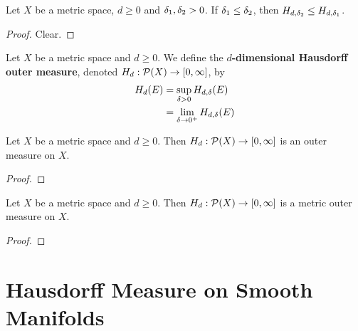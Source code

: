 \documentclass{book}
\begin{document}
	\begin{ex}
	Let $X$ be a metric space, $d \geq 0$ and $\delta_1, \delta_2 >0$. If $\delta_1 \leq \delta_2$, then $H_{d, \delta_2} \leq H_{d, \delta_1}$.
	\end{ex}
	
	\begin{proof}
	Clear.
	\end{proof}
	
	\begin{defn}
	Let $X$ be a metric space and $d \geq 0$. We define the \textbf{$d$-dimensional Hausdorff outer measure}, denoted $H_{d}: \mathcal{P}(X) \rightarrow [0, \infty]$, by 
	\begin{align*}
	H_{d}(E) 
	&= \sup\limits_{\delta > 0} H_{d, \delta}(E) \\
	&= \lim_{\delta \rightarrow 0^+} H_{d, \delta}(E)
	\end{align*}
	\end{defn}
	
	\begin{ex}
	Let $X$ be a metric space and $d \geq 0$. Then $H_d: \mathcal{P}(X) \rightarrow [0, \infty]$ is an outer measure on $X$.
	\end{ex}
	
	\begin{proof}
	
	\end{proof}
	
	\begin{ex}
	Let $X$ be a metric space and $d \geq 0$. Then $H_d: \mathcal{P}(X) \rightarrow [0, \infty]$ is a metric outer measure on $X$.
	\end{ex}
	
	\begin{proof}
	
	\end{proof}
	
	
	
	
	
	
	
	
	
	
	
	
	
	
	
	
	
	
	\newpage
	\section{Hausdorff Measure on Smooth Manifolds}
	
	
	
	
	
\end{document}
